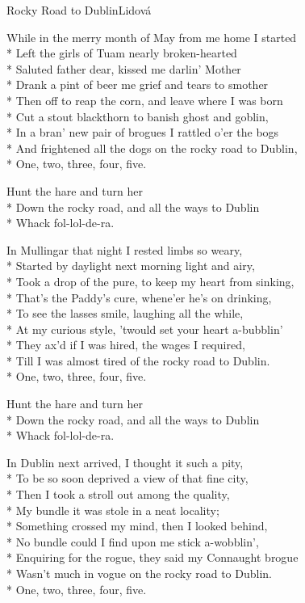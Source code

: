 \documentclass[10.5pt]{book}
\begin{document}
\begin{poem}{Rocky Road to Dublin}{Lidová}

\settowidth{\versewidth}{And I have frightened all the dogs on the rocky road
to Dublin,}

While in the merry month of May from me home I started\\*
Left the girls of Tuam nearly broken-hearted\\*
Saluted father dear, kissed me darlin' Mother\\*
Drank a pint of beer me grief and tears to smother\\*
Then off to reap the corn, and leave where I was born\\*
Cut a stout blackthorn to banish ghost and goblin,\\*
In a bran' new pair of brogues I rattled o'er the bogs\\*
And frightened all the dogs on the rocky road to Dublin,\\*
One, two, three, four, five. 

Hunt the hare and turn her\\*
Down the rocky road, and all the ways to Dublin\\*
Whack fol-lol-de-ra.

In Mullingar that night I rested limbs so weary,\\*
Started by daylight next morning light and airy,\\*
Took a drop of the pure, to keep my heart from \mbox{sinking},\\*
That's the Paddy's cure, whene'er he's on drinking,\\*
To see the lasses smile, laughing all the while,\\*
At my curious style, 'twould set your heart a-bubblin'\\*
They ax'd if I was hired, the wages I required,\\*
Till I was almost tired of the rocky road to Dublin.\\*
One, two, three, four, five. 

Hunt the hare and turn her\\*
Down the rocky road, and all the ways to Dublin\\*
Whack fol-lol-de-ra.

In Dublin next arrived, I thought it such a pity,\\*
To be so soon deprived a view of that fine city,\\*
Then I took a stroll out among the quality,\\*
My bundle it was stole in a neat locality;\\*
Something crossed my mind, then I looked behind,\\*
No bundle could I find upon me stick a-wobblin',\\*
Enquiring for the rogue, they said my Connaught brogue\\*
Wasn't much in vogue on the rocky road to Dublin.\\*
One, two, three, four, five. 


\end{poem}
\end{document}
